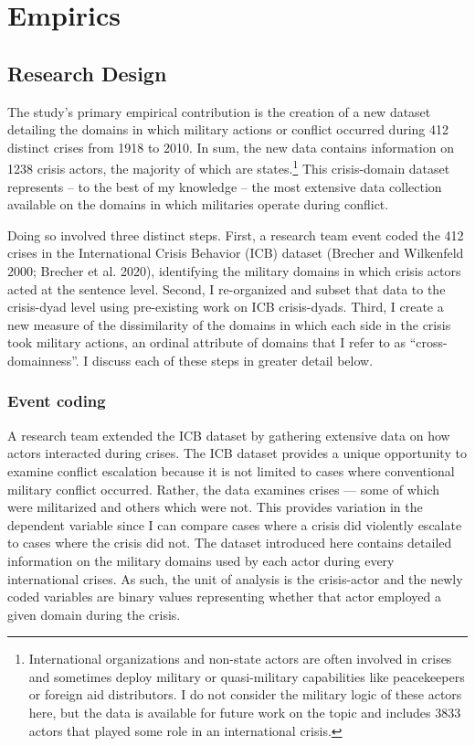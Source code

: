 \documentclass[
]{article}
\begin{document}
\hypertarget{empirics}{%
\section{Empirics}\label{empirics}}

\hypertarget{research-design}{%
\subsection{Research Design}\label{research-design}}

The study's primary empirical contribution is the creation of a new dataset detailing the domains in which military actions or conflict occurred during 412 distinct crises from 1918 to 2010. In sum, the new data contains information on 1238 crisis actors, the majority of which are states.\footnote{International organizations and non-state actors are often involved in crises and sometimes deploy military or quasi-military capabilities like peacekeepers or foreign aid distributors. I do not consider the military logic of these actors here, but the data is available for future work on the topic and includes 3833 actors that played some role in an international crisis.} This crisis-domain dataset represents -- to the best of my knowledge -- the most extensive data collection available on the domains in which militaries operate during conflict.

Doing so involved three distinct steps. First, a research team event coded the 412 crises in the International Crisis Behavior (ICB) dataset (Brecher and Wilkenfeld 2000; Brecher et al. 2020), identifying the military domains in which crisis actors acted at the sentence level. Second, I re-organized and subset that data to the crisis-dyad level using pre-existing work on ICB crisis-dyads. Third, I create a new measure of the dissimilarity of the domains in which each side in the crisis took military actions, an ordinal attribute of domains that I refer to as ``cross-domainness''. I discuss each of these steps in greater detail below.

\hypertarget{event-coding}{%
\subsubsection{Event coding}\label{event-coding}}

A research team extended the ICB dataset by gathering extensive data on how actors interacted during crises. The ICB dataset provides a unique opportunity to examine conflict escalation because it is not limited to cases where conventional military conflict occurred. Rather, the data examines crises --- some of which were militarized and others which were not. This provides variation in the dependent variable since I can compare cases where a crisis did violently escalate to cases where the crisis did not. The dataset introduced here contains detailed information on the military domains used by each actor during every international crises. As such, the unit of analysis is the crisis-actor and the newly coded variables are binary values representing whether that actor employed a given domain during the crisis.
\end{document}
